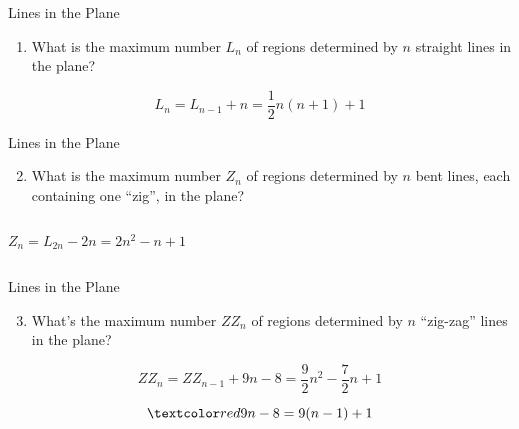 
\begin{frame}{}
  \begin{exampleblock}{Lines in the Plane}
    \begin{enumerate}[(1)]
      \item What is the maximum number $L_n$ of regions 
	determined by $n$ straight lines in the plane?
    \end{enumerate}

  \end{exampleblock}

  \pause
  \[
    L_n = L_{n-1} + n = \frac{1}{2} n(n+1) + 1
  \]
\end{frame}

\begin{frame}{}
  \begin{exampleblock}{Lines in the Plane}
    \begin{enumerate}[(1)]
      \setcounter{enumi}{1}
      \item What is the maximum number $Z_n$ of regions 
	determined by $n$ bent lines, each containing one ``zig'', 
	in the plane?
    \end{enumerate}

  \end{exampleblock}

  \begin{columns}
      \pause
      \pause
      \[
	Z_n = L_{2n} - 2n = 2n^2 - n + 1
      \]
  \end{columns}
\end{frame}

\begin{frame}{}
  \begin{exampleblock}{Lines in the Plane}
    \begin{enumerate}[(1)]
      \setcounter{enumi}{2}
      \item What's the maximum number $ZZ_n$ of regions
	determined by $n$ ``zig-zag'' lines in the plane?
    \end{enumerate}

  \end{exampleblock}

  \pause
  \[
    ZZ_n = ZZ_{n-1} + 9n - 8 = \frac{9}{2} n^2 - \frac{7}{2} n + 1
  \]

  \pause
  \[
    \red{9n - 8 = 9 (n-1) + 1}
  \]
\end{frame}
